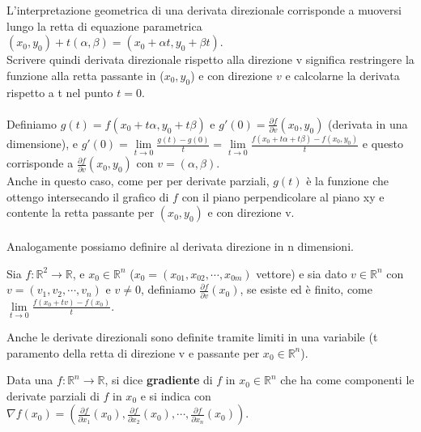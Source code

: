 \hspace{-15pt}L'interpretazione geometrica di una derivata direzionale corrisponde a muoversi lungo la retta di equazione parametrica $(x_0, y_0) + t(\alpha, \beta) = (x_0 + \alpha t, y_0 + \beta t)$. \\
Scrivere quindi derivata direzionale rispetto alla direzione v significa restringere la funzione alla retta passante in ($x_0,y_0$) e con direzione $v$ e calcolarne la derivata rispetto a t nel punto $t=0$. \\\\
Definiamo $g(t) = f(x_0 + t\alpha, y_0 + t\beta)$ e $g'(0) = \frac{\partial f}{\partial v}(x_0, y_0)$ (derivata in una dimensione), e $g'(0) = \lim\limits_{t\to 0}\frac{g(t) - g(0)}{t} =\lim\limits_{t\to 0}\frac{f(x_0 + t\alpha + t\beta) - f(x_0,y_0)}{t}$ e questo corrisponde a $\frac{\partial f}{\partial v}(x_0,y_0)$ con $v=(\alpha, \beta)$.\\
Anche in questo caso, come per per derivate parziali, $g(t)$ è la funzione che ottengo intersecando il grafico di $f$ con il piano perpendicolare al piano xy e contente la retta passante per $(x_0,y_0)$ e con direzione v.\\\\
Analogamente possiamo definire al derivata direzione in n dimensioni.

\begin{definition}
Sia $f: \mathbb{R}^2 \to \mathbb{R}$, e $x_0 \in \mathbb{R}^n$ ($x_0 = (x_{01}, x_{02}, \cdots, x_{0m})$ vettore) e sia dato $v \in \mathbb{R}^n$ con $v= (v_1, v_2, \cdots, v_n)$ e $v \neq 0$, definiamo $\frac{\partial f}{\partial v}(x_0)$, se esiste ed è finito, come $\lim\limits_{t\to 0}\frac{f(x_0 + tv) - f(x_0)}{t}$.
\end{definition}

\begin{observation}
Anche le derivate direzionali sono definite tramite limiti in una variabile (t paramento della retta di direzione v e passante per $x_0 \in \mathbb{R}^n$).
\end{observation}

\begin{definition}[Gradiente]
Data una $f: \mathbb{R}^n\to \mathbb{R}$, si dice \textbf{gradiente} di $f$ in $x_0 \in \mathbb{R}^n$ che ha come componenti le derivate parziali di $f$ in $x_0$ e si indica con $\nabla f(x_0) = (\frac{\partial f}{\partial x_1}(x_0), \frac{\partial f}{\partial x_2}(x_0), \cdots, \frac{\partial f}{\partial x_n}(x_0))$.
\end{definition}

